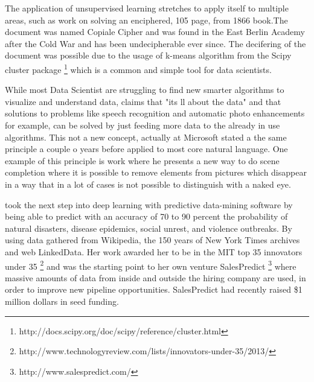 The application of unsupervised learning stretches to apply itself to multiple areas, such as \citet{Knight2011a} work on solving an enciphered, 105 page, from 1866 book.The document was named Copiale Cipher and was found in the East Berlin Academy after the Cold War and has been undecipherable ever since. The decifering of the document was possible due to the usage of k-means algorithm from the Scipy cluster package \footnote{http://docs.scipy.org/doc/scipy/reference/cluster.html} which is a common and simple tool for data scientists. 

While most Data Scientist are struggling to find new smarter algorithms to visualize and understand data, \citet{Halevy2009} claims that "its ll about the data" and that solutions to problems like speech recognition and automatic photo enhancements for example, can be solved by just feeding more data to the already in use algorithms. This not a new concept, actually \citet{Banko2001} at Microsoft stated a the same principle a couple o years before applied to most core natural language. One example of this principle is \citet{Hays2007a} work where he presents a new way to do scene completion where it is possible to remove elements from pictures which disappear in a way that in a lot of cases is not possible to distinguish with a naked eye.

\citet{Radinsky2013} took the next step into deep learning with predictive data-mining software by being able to predict with an accuracy of 70 to 90 percent the probability of natural disasters, disease epidemics, social unrest, and violence outbreaks. By using data gathered from Wikipedia, the 150 years of New York Times archives and web LinkedData. Her work awarded her to be in the MIT top 35 innovators under 35 \footnote{http://www.technologyreview.com/lists/innovators-under-35/2013/} and was the starting point to her own venture SalesPredict \footnote{http://www.salespredict.com/} where massive amounts of data from inside and outside the hiring company are used, in order to improve new pipeline opportunities. SalesPredict had recently raised \$1 million dollars in seed funding.

